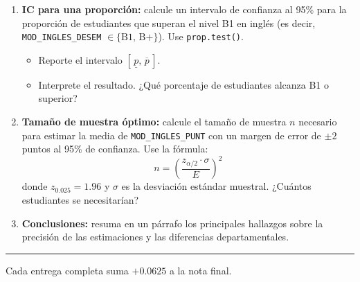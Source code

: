 \documentclass[11pt, a4paper]{article}
\begin{document}
\begin{enumerate}[label=\alph*)]
  \item \textbf{IC para una proporci\'on:} calcule un intervalo de confianza al
        95\% para la proporci\'on de estudiantes que superan el nivel B1 en
        ingl\'es (es decir, \texttt{MOD\_INGLES\_DESEM} $\in \{\text{B1, B+}\}$).
        Use \texttt{prop.test()}.
        \begin{itemize}
          \item Reporte el intervalo $[\,\underline{p},\, \overline{p}\,]$.
          \item Interprete el resultado. ¿Qu\'e porcentaje de estudiantes alcanza
                B1 o superior?
        \end{itemize}

  \item \textbf{Tama\~no de muestra \'optimo:} calcule el tama\~no de muestra $n$
        necesario para estimar la media de \texttt{MOD\_INGLES\_PUNT} con un margen
        de error de $\pm 2$ puntos al 95\% de confianza. Use la f\'ormula:
        \[
          n = \left( \frac{z_{\alpha/2} \cdot \sigma}{E} \right)^2
        \]
        donde $z_{0.025} = 1.96$ y $\sigma$ es la desviaci\'on est\'andar muestral.
        ¿Cu\'antos estudiantes se necesitar\'ian?

  \item \textbf{Conclusiones:} resuma en un p\'arrafo los principales hallazgos
        sobre la precisi\'on de las estimaciones y las diferencias departamentales.
\end{enumerate}

\vspace{10pt}
\rule{\linewidth}{0.4pt}
\begin{center}
{\small Cada entrega completa suma $+0.0625$ a la nota final.}
\end{center}
\end{document}
